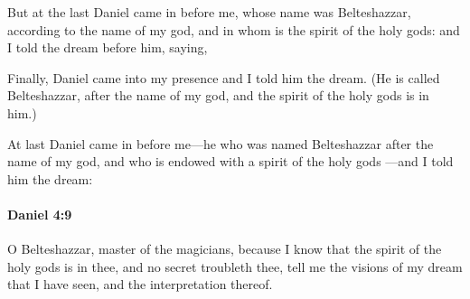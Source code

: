 			\begin{versebox}
					\item[BHS] 
					\item[LXX] 
					\item[ASV] But at the last Daniel came in before me, whose name was Belteshazzar, according to the name of my god, and in whom is the spirit of the holy gods: and I told the dream before him, saying,
					\item[NIV] Finally, Daniel came into my presence and I told him the dream. (He is called Belteshazzar, after the name of my god, and the spirit of the holy gods is in him.)
					\item[NRSV] At last Daniel came in before me—he who was named Belteshazzar after the name of my god, and who is endowed with a spirit of the holy gods —and I told him the dream:
			\end{versebox}

		\paragraph{Daniel 4:9} %
			\label{DANIEL-4-9}

			O Belteshazzar, master of the magicians, because I know that the spirit of the holy gods is in thee, and no secret troubleth thee, tell me the visions of my dream that I have seen, and the interpretation thereof.

